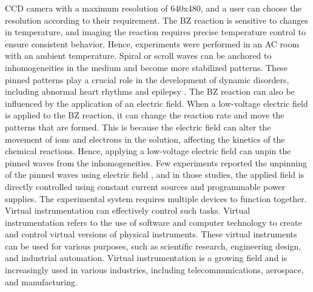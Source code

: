 \documentclass[journal=jacsat,manuscript=article]{achemso}
\begin{document}
CCD camera with a maximum resolution of 640x480, and a user can choose
the resolution according to their requirement.  The BZ reaction is
sensitive to changes in temperature, and imaging the reaction requires
precise temperature control to ensure consistent behavior. Hence,
experiments were performed in an AC room with an ambient temperature.
Spiral or scroll waves can be anchored to inhomogeneities in the
medium and become more stabilized patterns. These pinned patterns play
a crucial role in the development of dynamic disorders, including
abnormal heart rhythms \cite{bruser2012automatic}
\cite{kundu2021amplitude} and epilepsy \cite{punacha2020theory}. The
BZ reaction can also be influenced by the application of an electric
field. When a low-voltage electric field is applied to the BZ
reaction, it can change the reaction rate and move the patterns that
are formed. This is because the electric field can alter the movement
of ions and electrons in the solution, affecting the kinetics of the
chemical reactions. Hence, applying a low-voltage electric field can
unpin the pinned waves from the inhomogeneities. Few experiments
reported the unpinning of the pinned waves using electric field
\cite{steinbock1992electric}\cite{ji2013experimental}\cite{jimenez2013electric}\cite{sutthiopad2014unpinning}\cite{porjai2016electrically},
and in those studies, the applied field is directly controlled using
constant current sources and programmable power supplies. The
experimental system requires multiple devices to function together.
Virtual instrumentation can effectively control such tasks. Virtual
instrumentation refers to the use of software and computer technology
to create and control virtual versions of physical instruments. These
virtual instruments can be used for various purposes, such as
scientific research, engineering design, and industrial automation.
Virtual instrumentation is a growing field and is increasingly used in
various industries, including telecommunications, aerospace, and
manufacturing.
\end{document}
